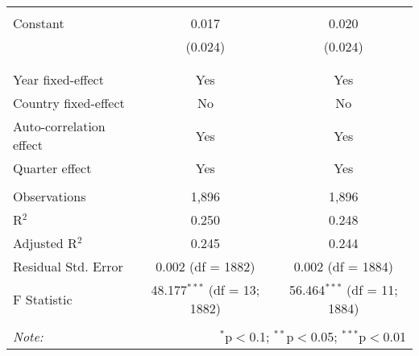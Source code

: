 \begin{table}[!htbp]
\begin{tabular}{@{\extracolsep{5pt}}lcc}
  & & \\ 
 Constant & 0.017 & 0.020 \\ 
  & (0.024) & (0.024) \\ 
  & & \\ 
\hline \\[-1.8ex] 
Year fixed-effect & Yes & Yes \\ 
Country fixed-effect & No & No \\ 
Auto-correlation effect & Yes & Yes \\ 
Quarter effect & Yes & Yes \\ 
\hline \\[-1.8ex] 
Observations & 1,896 & 1,896 \\ 
R$^{2}$ & 0.250 & 0.248 \\ 
Adjusted R$^{2}$ & 0.245 & 0.244 \\ 
Residual Std. Error & 0.002 (df = 1882) & 0.002 (df = 1884) \\ 
F Statistic & 48.177$^{***}$ (df = 13; 1882) & 56.464$^{***}$ (df = 11; 1884) \\ 
\hline 
\hline \\[-1.8ex] 
\textit{Note:}  & \multicolumn{2}{r}{$^{*}$p$<$0.1; $^{**}$p$<$0.05; $^{***}$p$<$0.01} \\ 
\end{tabular} 
\end{table} 
